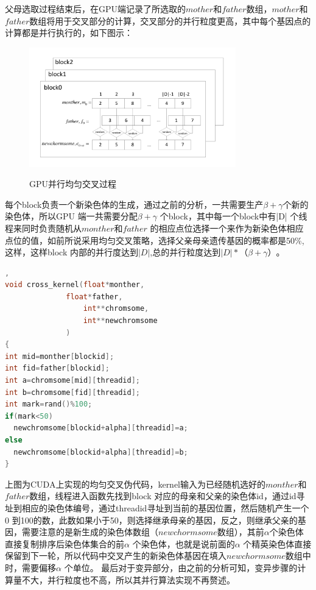   父母选取过程结束后，在GPU端记录了所选取的$mother$和$father$数组，$mother$和$father$数组将用于交叉部分的计算，交叉部分的并行粒度更高，其中每个基因点的计算都是并行执行的，如下图示：
\begin{figure}
  \begin{center}
    {\includegraphics[width=0.8\textwidth]{figures/GPUcross.pdf}}
    \end{center}
  \caption{{\footnotesize{GPU并行均匀交叉过程}}}
  \label{IterNum}
\end{figure}
  每个block负责一个新染色体的生成，通过之前的分析，一共需要生产$\beta+\gamma$个新的染色体，所以GPU 端一共需要分配$\beta+\gamma$ 个block，其中每一个block中有|D| 个线程来同时负责随机从$monther$和$father$ 的相应点位选择一个来作为新染色体相应点位的值，如前所说采用均匀交叉策略，选择父亲母亲遗传基因的概率都是50\%,这样，这样block 内部的并行度达到$|D|$,总的并行粒度达到$|D|*（\beta+\gamma）$。
\begin{lstlisting}[language=C],
void cross_kernel(float*monther,
			  float*father,
	     		  int**chromsome,
                  int**newchromsome
			  )
{
int mid=monther[blockid];
int fid=father[blockid];
int a=chromsome[mid][threadid];
int b=chromsome[fid][threadid];
int mark=rand()%100;
if(mark<50)
  newchromsome[blockid+alpha][threadid]=a;
else
  newchromsome[blockid+alpha][threadid]=b;
}
\end{lstlisting}
  上图为CUDA上实现的均匀交叉伪代码，kernel输入为已经随机选好的$monther$和$father$数组，线程进入函数先找到block 对应的母亲和父亲的染色体id，通过id寻址到相应的染色体编号，通过threadid寻址到当前的基因位置，然后随机产生一个0 到100的数，此数如果小于50，则选择继承母亲的基因，反之，则继承父亲的基因，需要注意的是新生成的染色体数组（$newchormsome$数组），其前$\alpha$个染色体直接复制排序后染色体集合的前$\alpha$ 个染色体，也就是说前面的$\alpha$ 个精英染色体直接保留到下一轮，所以代码中交叉产生的新染色体基因在填入$newchormsome$数组中时，需要偏移$\alpha$ 个单位。
  最后对于变异部分，由之前的分析可知，变异步骤的计算量不大，并行粒度也不高，所以其并行算法实现不再赘述。
